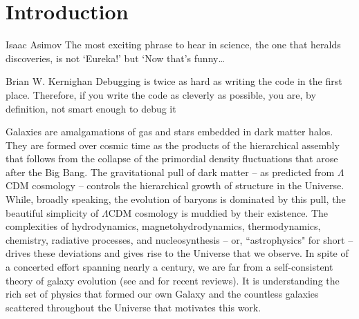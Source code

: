 \chapter[Introduction]{Introduction}
\label{ch:intro}
\vspace{-16pt}
\begin{chapquote}{Isaac Asimov} \singlespacing The most exciting phrase to hear in science, the one that heralds discoveries, is not ‘Eureka!’ but ‘Now that’s funny…
\end{chapquote} \vspace{-8pt}
\begin{chapquote}{Brian W. Kernighan} \singlespacing Debugging is twice as hard as writing the code in the first place. Therefore, if you write the code as cleverly as possible, you are, by definition, not smart enough to debug it
\end{chapquote} \vspace{-8pt}

\noindent\makebox[\linewidth]{\rule{0.5\textwidth}{0.5pt}} \vspace{1pt}

\newcommand{\code}{\textsc}
\newcommand{\Hmolecular}{H$_2$}

%
Galaxies are amalgamations of gas and stars embedded in dark matter halos. They are formed over cosmic time as the products of the hierarchical assembly that follows from the collapse of the primordial density fluctuations that arose after the Big Bang. The gravitational pull of dark matter -- as predicted from $\Lambda$CDM cosmology -- controls the hierarchical growth of structure in the Universe. While, broadly speaking, the evolution of baryons is dominated by this pull, the beautiful simplicity of $\Lambda$CDM cosmology is muddied by their existence. The complexities of hydrodynamics, magnetohydrodynamics, thermodynamics, chemistry, radiative processes, and nucleosynthesis -- or, ``astrophysics" for short -- drives these deviations and gives rise to the Universe that we observe. In spite of a concerted effort spanning nearly a century, we are far from a self-consistent theory of galaxy evolution (see \citet{SomervilleDave2015} and \cite{NaabOstriker2017} for recent reviews). It is understanding the rich set of physics that formed our own Galaxy and the countless galaxies scattered throughout the Universe that motivates this work.

